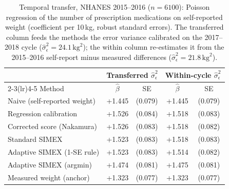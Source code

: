 \begin{table}[t]
\centering
\small
\caption{Temporal transfer, NHANES 2015--2016 ($n=6100$):
Poisson regression of the number of prescription medications on
self-reported weight (coefficient per 10\,kg, robust standard
errors). The transferred column feeds the methods the error
variance calibrated on the 2017--2018 cycle
($\hat\sigma^2_\epsilon = 24.1\,\mathrm{kg}^2$);
the within column re-estimates it from the 2015--2016
self-report minus measured differences
($\hat\sigma^2_\epsilon = 21.8\,\mathrm{kg}^2$).}
\label{tab:transfer}
\begin{tabular}{lcccc}
\toprule
 & \multicolumn{2}{c}{Transferred $\hat\sigma^2_\epsilon$} & \multicolumn{2}{c}{Within-cycle $\hat\sigma^2_\epsilon$} \\
\cmidrule(lr){2-3}\cmidrule(lr){4-5}
Method & $\hat\beta$ & SE & $\hat\beta$ & SE \\
\midrule
Naive (self-reported weight) & +1.445 & (0.079) & +1.445 & (0.079) \\
Regression calibration & +1.526 & (0.084) & +1.518 & (0.083) \\
Corrected score (Nakamura) & +1.526 & (0.083) & +1.518 & (0.082) \\
Standard SIMEX & +1.523 & (0.083) & +1.518 & (0.083) \\
Adaptive SIMEX (1-SE rule) & +1.523 & (0.083) & +1.514 & (0.082) \\
Adaptive SIMEX (argmin) & +1.474 & (0.081) & +1.475 & (0.081) \\
Measured weight (anchor) & +1.323 & (0.077) & +1.323 & (0.077) \\
\bottomrule
\end{tabular}
\end{table}